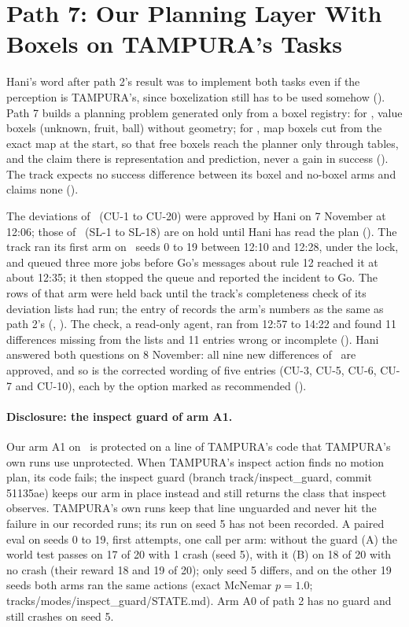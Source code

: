 \section{Path 7: Our Planning Layer With Boxels on TAMPURA's Tasks}
\label{sec:path7}

Hani's word after path 2's result was to implement both tasks even if the perception
is TAMPURA's, since boxelization still has to be used somehow (). Path 7 builds
a planning problem generated only from a boxel registry: for \cuncert, value
boxels (unknown, fruit, ball) without geometry; for \slamcol, map boxels cut from
the exact map at the start, so that free boxels reach the planner only through
tables, and the claim there is representation and prediction, never a gain in success
(). The track expects no success difference between its boxel and no-boxel arms
and claims none ().

The deviations of \cuncert\ (CU-1 to CU-20) were approved by Hani on 7 November at
12:06; those of \slamcol\ (SL-1 to SL-18) are on hold until Hani has read the plan
(). The track ran its first arm on \cuncert\ seeds 0 to 19 between 12:10 and
12:28, under the lock, and queued three more jobs before Go's messages about rule 12
reached it at about 12:35; it then stopped the queue and reported the incident to Go.
The rows of that arm were held back until the track's completeness check of its
deviation lists had run; the entry of  records the arm's numbers as the same as
path 2's (, ). The check, a read-only agent, ran from 12:57 to 14:22 and
found 11 differences missing from the lists and 11 entries wrong or incomplete
(). Hani answered both questions on 8 November: all nine new
differences of \cuncert\ are approved, and so is the corrected wording of five entries (CU-3, CU-5, CU-6,
CU-7 and CU-10), each by the option marked as recommended
().

\paragraph{Disclosure: the inspect guard of arm A1.} Our arm A1 on \cuncert\ is protected
on a line of TAMPURA's code that TAMPURA's own runs use unprotected. When TAMPURA's
inspect action finds no motion plan, its code fails; the inspect guard (branch
track/inspect\_guard, commit 51135ae) keeps our arm in place instead and still returns
the class that inspect observes. TAMPURA's own runs keep that line unguarded and never
hit the failure in our recorded runs; its run on seed 5 has not been recorded. A paired
eval on seeds 0 to 19, first attempts, one call per arm: without the guard (A) the world
test passes on 17 of 20 with 1 crash (seed 5), with it (B) on 18 of 20 with no crash
(their reward 18 and 19 of 20); only seed 5 differs, and on the other 19 seeds both arms
ran the same actions (exact McNemar $p = 1.0$; tracks/modes/inspect\_guard/STATE.md).
Arm A0 of path 2 has no guard and still crashes on seed 5.

